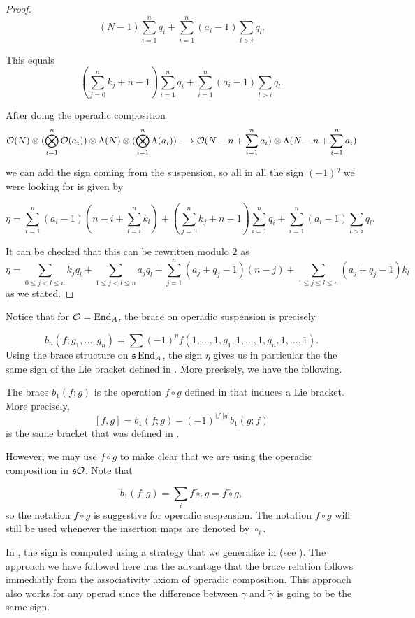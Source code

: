 \documentclass[join.tex]{subfiles}
\begin{document}
\begin{proof}
\[(N-1)\sum_{i=1}^nq_i+\sum_{i=1}^n (a_i-1)\sum_{l>i}q_l.\]

This equals
\[(\sum_{j=0}^nk_j +n-1)\sum_{i=1}^nq_i+\sum_{i=1}^n (a_i-1)\sum_{l>i}q_l.\]

After doing the operadic composition 
\[{\mathcal O}(N)\otimes(\bigotimes_{i=1}^n {\mathcal O}(a_i))\otimes \Lambda(N)\otimes(\bigotimes_{i=1}^n \Lambda(a_i))\longrightarrow {\mathcal O}(N-n+\sum_{i=1}^na_i)\otimes \Lambda(N-n+\sum_{i=1}^na_i)\]

we can add the sign coming from the suspension, so all in all the sign $(-1)^\eta$ we were looking for is given by

\[\eta=\sum_{i=1}^n(a_i-1)(n-i+\sum_{l=i}^nk_l)+(\sum_{j=0}^nk_j +n-1)\sum_{i=1}^nq_i+\sum_{i=1}^n (a_i-1)\sum_{l>i}q_l.\]

It can be checked that this can be rewritten modulo $2$ as 
\[\eta=\sum_{0\leq j<l\leq n}k_jq_l+\sum_{1\leq j<l\leq n}a_jq_l+\sum_{j=1}^n (a_j+q_j-1)(n-j)+\sum_{1\leq j\leq l\leq n} (a_j+q_j-1)k_l\]
as we stated.
\end{proof}

 Notice that for ${\mathcal O}=\operatorname{End}_A$, the brace on operadic suspension is precisely
 
 \[b_n(f;g_1,\dots,g_n)=\sum (-1)^\eta f(1,\dots,1,g_1,1,\dots,1,g_n,1,\dots,1).\]
Using the brace structure on $\mathfrak{s}\operatorname{End}_A$, the sign $\eta$ gives us in particular the the same sign of the Lie bracket defined in \cite{RW}. More precisely, we have the following.

\begin{corollary} The brace $b_1(f;g)$ is the operation $f\circ g$ defined in \cite{RW} that induces a Lie bracket. More precisely,
\[
[f,g]=b_1(f;g)-(-1)^{|f||g|}b_1(g;f)
\]
is the same bracket that was defined in \cite{RW}. 
\end{corollary} 
However, we may use $f\tilde{\circ}g$ to make clear that we are using the operadic composition in $\mathfrak{s}{\mathcal O}$. Note that

\[
b_1(f;g)=\sum_i f\tilde{\circ}_i g=f\tilde{\circ}g,
\]
so the notation $f\tilde{\circ} g$ is suggestive for operadic suspension. The notation $f\circ g$ will still be used whenever the insertion maps are denoted by $\circ_i$.

In \cite{RW}, the sign is computed using a strategy that we generalize in  (see ). The approach we have followed here has the advantage that the brace relation follows immediatly from the associativity axiom of operadic composition. This approach also works for any operad since the difference between $\gamma$ and $\tilde{\gamma}$ is going to be the same sign. 
\end{document}
